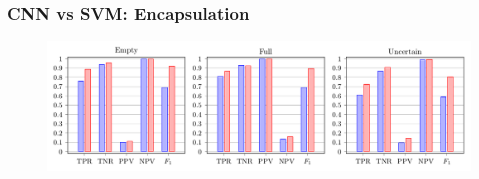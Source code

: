 \documentclass{beamer}
\begin{document}
\begin{frame}
\frametitle{CNN vs SVM: Encapsulation}

\begin{figure}
\centering
\includegraphics[width=\linewidth,height=0.8\textheight,keepaspectratio]{cnn_vs_svm_encapsulation.png} 
\end{figure}

\end{frame}
\end{document}
